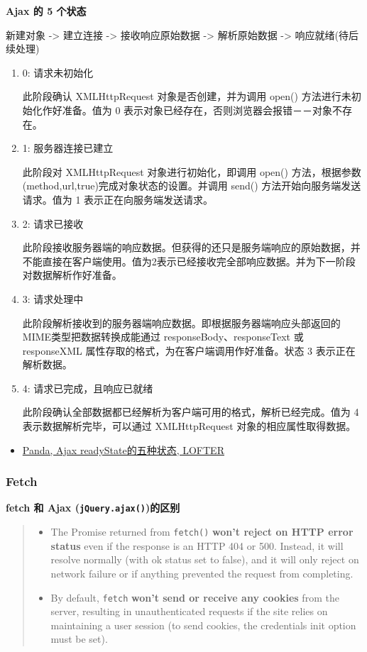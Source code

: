 \textbf{Ajax 的 5 个状态}

新建对象 -\textgreater{} 建立连接 -\textgreater{} 接收响应原始数据
-\textgreater{} 解析原始数据 -\textgreater{} 响应就绪(待后续处理)

\begin{enumerate}
\def\labelenumi{\arabic{enumi}.}
\item
  0: 请求未初始化

  此阶段确认 XMLHttpRequest 对象是否创建，并为调用 open()
  方法进行未初始化作好准备。值为 0
  表示对象已经存在，否则浏览器会报错－－对象不存在。
\item
  1: 服务器连接已建立

  此阶段对 XMLHttpRequest 对象进行初始化，即调用 open() 方法，根据参数
  (method,url,true)完成对象状态的设置。并调用 send()
  方法开始向服务端发送请求。值为 1 表示正在向服务端发送请求。
\item
  2: 请求已接收

  此阶段接收服务器端的响应数据。但获得的还只是服务端响应的原始数据，并不能直接在客户端使用。值为2表示已经接收完全部响应数据。并为下一阶段对数据解析作好准备。
\item
  3: 请求处理中

  此阶段解析接收到的服务器端响应数据。即根据服务器端响应头部返回的MIME类型把数据转换成能通过
  responseBody、responseText 或 responseXML
  属性存取的格式，为在客户端调用作好准备。状态 3 表示正在解析数据。
\item
  4: 请求已完成，且响应已就绪

  此阶段确认全部数据都已经解析为客户端可用的格式，解析已经完成。值为 4
  表示数据解析完毕，可以通过 XMLHttpRequest 对象的相应属性取得数据。
\end{enumerate}

\begin{itemize}
\tightlist
\item
  \href{http://blog.163.com/freestyle_le/blog/static/183279448201269112527311/}{Panda,
  Ajax readyState的五种状态, LOFTER}
\end{itemize}

\subsubsection{Fetch}\label{fetch}

\textbf{fetch 和 Ajax (\lstinline!jQuery.ajax()!)的区别}

\begin{quote}
\begin{itemize}
\tightlist
\item
  The Promise returned from \lstinline!fetch()! \textbf{won't reject on
  HTTP error status} even if the response is an HTTP 404 or 500.
  Instead, it will resolve normally (with ok status set to false), and
  it will only reject on network failure or if anything prevented the
  request from completing.
\item
  By default, \lstinline!fetch! \textbf{won't send or receive any
  cookies} from the server, resulting in unauthenticated requests if the
  site relies on maintaining a user session (to send cookies, the
  credentials init option must be set).
\end{itemize}
\end{quote}

